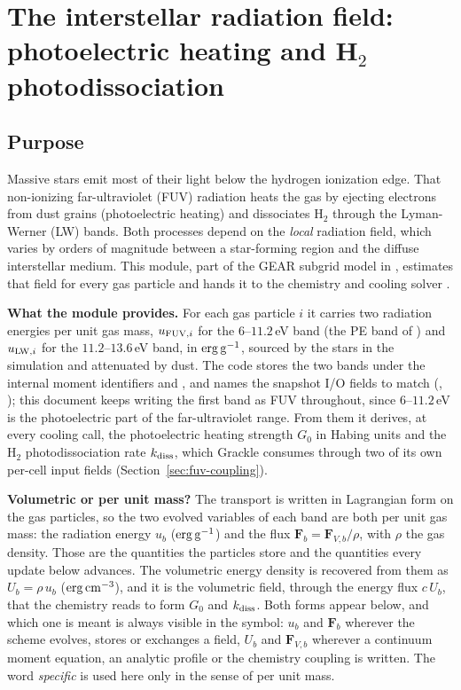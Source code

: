 \section{The interstellar radiation field: photoelectric heating and
H$_2$ photodissociation}
\label{sec:fuv-isrf}

\subsection{Purpose}
\label{sec:fuv-purpose}

Massive stars emit most of their light below the hydrogen ionization
edge. That non-ionizing far-ultraviolet (FUV) radiation heats the gas by
ejecting electrons from dust grains (photoelectric heating) and
dissociates H$_2$ through the Lyman-Werner (LW) bands. Both processes
depend on the \emph{local} radiation field, which varies by orders of
magnitude between a star-forming region and the diffuse interstellar
medium. This module, part of the GEAR subgrid model
\citep{RevazJablonka2018} in \swift{} \citep{Schaller2024}, estimates that
field for every gas particle and hands it to the chemistry and cooling
solver \citep[Grackle,][]{Smith2017}.

\textbf{What the module provides.} For each gas particle $i$ it carries
two radiation energies per unit gas mass, $u_{{\rm FUV},i}$ for the
$6$--$11.2$\,eV band (the PE band of \citealt{Kim2023}) and $u_{{\rm LW},i}$ for the $11.2$--$13.6$\,eV band, in
${\rm erg\,g^{-1}}$, sourced by the stars in the simulation and
attenuated by dust. The code stores the two bands under the internal
moment identifiers  and , and names the
snapshot I/O fields to match (,
); this document keeps writing the first band as
FUV throughout, since $6$--$11.2$\,eV is the photoelectric part of the
far-ultraviolet range.
From them it derives, at every cooling call, the
photoelectric heating strength $G_0$ in Habing units and the H$_2$
photodissociation rate $k_{\rm diss}$, which Grackle consumes through two
of its own per-cell input fields (Section~\ref{sec:fuv-coupling}).

\textbf{Volumetric or per unit mass?} The transport is written in
Lagrangian form on the gas particles, so the two evolved variables of each
band are both per unit gas mass: the radiation energy $u_b$
(${\rm erg\,g^{-1}}$) and the flux $\mathbf F_b = \mathbf F_{V,b}/\rho$,
with $\rho$ the gas density. Those are the quantities the particles store
and the quantities every update below advances. The volumetric energy
density is recovered from them as $U_b = \rho\,u_b$
(${\rm erg\,cm^{-3}}$), and it is the volumetric field, through the energy
flux $c\,U_b$, that the chemistry reads to form $G_0$ and $k_{\rm diss}$.
Both forms appear below, and which one is meant is always visible in the
symbol: $u_b$ and $\mathbf F_b$ wherever the scheme evolves, stores or
exchanges a field, $U_b$ and $\mathbf F_{V,b}$ wherever a continuum moment
equation, an analytic profile or the chemistry coupling is written. The
word \emph{specific} is used here only in the sense of per unit mass.

